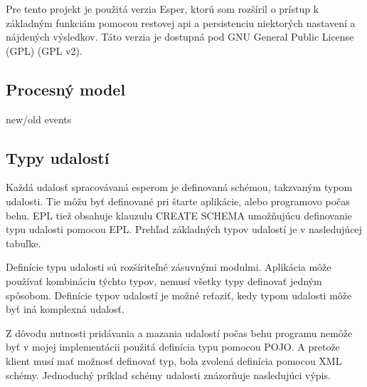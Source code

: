 	Pre tento projekt je použitá verzia Esper, ktorú som rozšíril o prístup k základným funkciám pomocou restovej api a persistenciu niektorých nastavení a nájdených výsledkov. Táto verzia je dostupná pod GNU General Public License (GPL) (GPL v2).

	\subsection{Procesný model}
	new/old events
	
	\subsection{Typy udalostí}
	Každá udalosť spracovávaná esperom je definovaná schémou, takzvaným typom udalosti. Tie môžu byť definované pri štarte aplikácie, alebo programovo počas behu. EPL tiež obsahuje klauzulu CREATE SCHEMA umožňujúcu definovanie typu udalosti pomocou EPL. Prehľad základných typov udalostí je v nasledujúcej tabuľke.

	
	Definície typu udalosti sú rozšíriteľné zásuvnými modulmi. Aplikácia môže používať kombináciu týchto typov, nemusí všetky typy definovať jedným spôsobom. Definície typov udalostí je možné reťaziť, kedy typom udalosti môže byť iná komplexná udalosť.
	
	Z dôvodu nutnosti pridávania a mazania udalostí počas behu programu nemôže byť v mojej implementácii použitá definícia typu pomocou POJO. A pretože klient musí mať možnosť definovať typ, bola zvolená definícia pomocou XML schémy. Jednoduchý príklad schémy udalosti znázorňuje nasledujúci výpis. 
	

